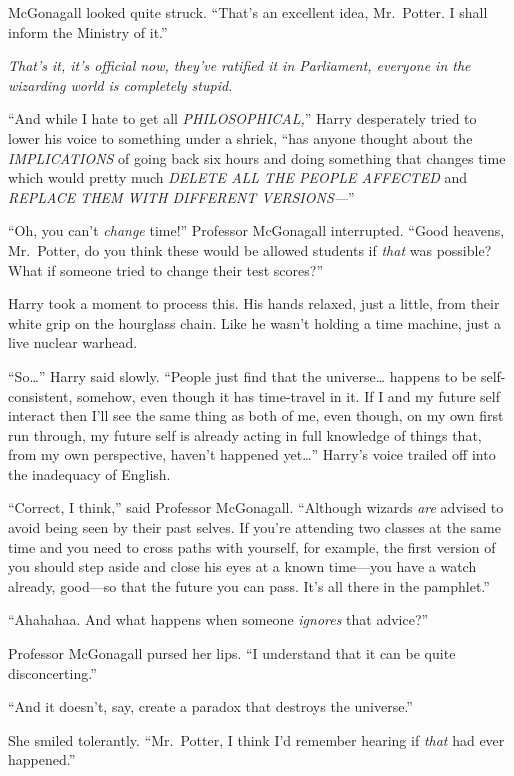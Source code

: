 McGonagall looked quite struck. ``That's an excellent idea, Mr.~Potter.
I shall inform the Ministry of it.''

\emph{That's it, it's official now, they've ratified it in Parliament,
everyone in the wizarding world is completely stupid.}

``And while I hate to get all \emph{PHILOSOPHICAL,}'' Harry desperately
tried to lower his voice to something under a shriek, ``has anyone
thought about the \emph{IMPLICATIONS} of going back six hours and doing
something that changes time which would pretty much \emph{DELETE ALL THE
PEOPLE AFFECTED} and \emph{REPLACE THEM WITH DIFFERENT VERSIONS---}''

``Oh, you can't \emph{change} time!'' Professor McGonagall interrupted.
``Good heavens, Mr.~Potter, do you think these would be allowed students
if \emph{that} was possible? What if someone tried to change their test
scores?''

Harry took a moment to process this. His hands relaxed, just a little,
from their white grip on the hourglass chain. Like he wasn't holding a
time machine, just a live nuclear warhead.

``So\ldots{}'' Harry said slowly. ``People just find that the
universe\ldots{} happens to be self-consistent, somehow, even though it
has time-travel in it. If I and my future self interact then I'll see
the same thing as both of me, even though, on my own first run through,
my future self is already acting in full knowledge of things that, from
my own perspective, haven't happened yet\ldots{}'' Harry's voice trailed
off into the inadequacy of English.

``Correct, I think,'' said Professor McGonagall. ``Although wizards
\emph{are} advised to avoid being seen by their past selves. If you're
attending two classes at the same time and you need to cross paths with
yourself, for example, the first version of you should step aside and
close his eyes at a known time---you have a watch already, good---so
that the future you can pass. It's all there in the pamphlet.''

``Ahahahaa. And what happens when someone \emph{ignores} that advice?''

Professor McGonagall pursed her lips. ``I understand that it can be
quite disconcerting.''

``And it doesn't, say, create a paradox that destroys the universe.''

She smiled tolerantly. ``Mr.~Potter, I think I'd remember hearing if
\emph{that} had ever happened.''

